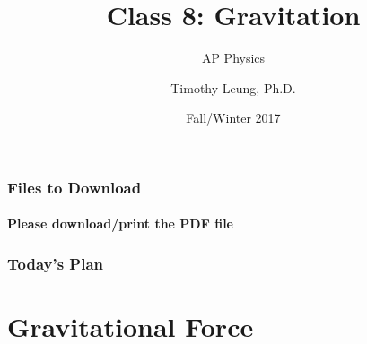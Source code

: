 \documentclass[12pt,compress,aspectratio=169]{beamer}
\title{Class 8: Gravitation}
\subtitle{AP Physics}
\author[TML]{Timothy Leung, Ph.D.}
\institute{Olympiads School}
\date{Fall/Winter 2017}
\begin{document}
\begin{frame}
  \maketitle
\end{frame}


\begin{frame}
  \frametitle{Files to Download}
  \framesubtitle{Please download/print the PDF file}
\end{frame}


\begin{frame}
  \frametitle{Today's Plan}
\end{frame}



\section{Gravitational Force}
%
\end{document}
